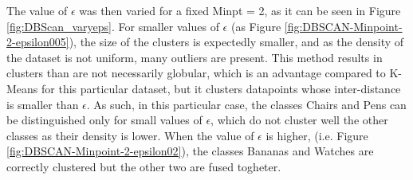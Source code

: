 \documentclass[a4paper,10pt]{article}
\begin{document}
The value of $\epsilon$ was then varied for a fixed Minpt = 2, as it can be seen in Figure \ref{fig:DBScan_varyeps}.
For smaller values of $\epsilon$ (as Figure \ref{fig:DBSCAN-Minpoint-2-epsilon005}), the size of the clusters is expectedly smaller, and as the density of the dataset is not uniform, many outliers are present. This method results in  clusters than are not necessarily globular, which is an advantage compared to K-Means for this particular dataset, but it clusters datapoints whose inter-distance is smaller than $\epsilon$. As such, in this particular case, the classes Chairs and Pens can be distinguished only for small values of $\epsilon$, which do not cluster well the other classes as their density is lower. When the value of $\epsilon$ is higher, (i.e. Figure \ref{fig:DBSCAN-Minpoint-2-epsilon02}), the classes Bananas and Watches are correctly clustered but the other two are fused togheter.
\end{document}
